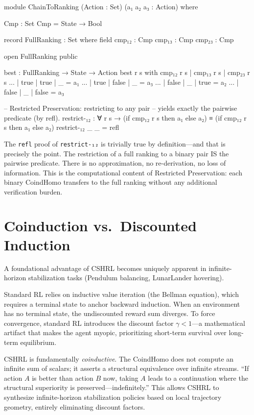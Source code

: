 \documentclass[9pt,a4paper]{article}
\theoremstyle{plain}
\theoremstyle{definition}
\theoremstyle{remark}
\begin{document}
\begin{spec}
  module ChainToRanking
    (Action : Set) (a₁ a₂ a₃ : Action) where

    Cmp : Set
    Cmp = State → Bool

    record FullRanking : Set where
  field
        cmp₁₂ : Cmp
        cmp₁₃ : Cmp
        cmp₂₃ : Cmp

    open FullRanking public

    best : FullRanking → State → Action
    best r s with cmp₁₂ r s | cmp₁₃ r s | cmp₂₃ r s
    ... | true  | true  | _     = a₁
    ... | true  | false | _     = a₃
    ... | false | _     | true  = a₂
    ... | false | _     | false = a₃

    -- Restricted Preservation: restricting to any pair
    -- yields exactly the pairwise predicate (by refl).
    restrict-₁₂ : ∀ r s →
      (if cmp₁₂ r s then a₁ else a₂) ≡
      (if cmp₁₂ r s then a₁ else a₂)
    restrict-₁₂ _ _ = refl
\end{spec}

The \texttt{refl} proof of \texttt{restrict-₁₂} is trivially true
by definition---and that is precisely the point. The restriction of a
full ranking to a binary pair IS the pairwise predicate. There is no
approximation, no re-derivation, no loss of information. This is the
computational content of Restricted Preservation: each binary
CoindHomo transfers to the full ranking without any additional
verification burden.

\section{Coinduction vs.\ Discounted Induction}

A foundational advantage of CSHRL becomes uniquely apparent in
infinite-horizon stabilization tasks (Pendulum balancing, LunarLander
hovering).

Standard RL relies on inductive value iteration (the Bellman equation),
which requires a terminal state to anchor backward induction. When an
environment has no terminal state, the undiscounted reward sum
diverges. To force convergence, standard RL introduces the discount
factor $\gamma < 1$---a mathematical artifact that makes the agent
myopic, prioritizing short-term survival over long-term equilibrium.

CSHRL is fundamentally \emph{coinductive}. The CoindHomo does not
compute an infinite sum of scalars; it asserts a structural
equivalence over infinite streams. ``If action $A$ is better than
action $B$ now, taking $A$ leads to a continuation where the
structural superiority is preserved---indefinitely.'' This allows
CSHRL to synthesize infinite-horizon stabilization policies
based on local trajectory geometry, entirely eliminating
discount factors.
\end{document}
